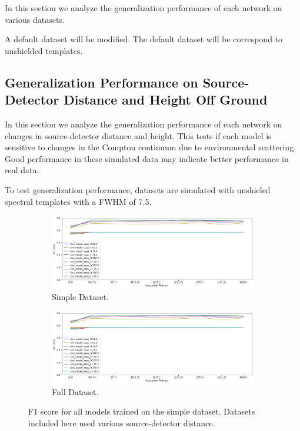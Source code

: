 In this section we analyze the generalization performance of each network on various datasets. 

A default dataset will be modified. The default dataset will be  correspond to unshielded templates. 

\subsection{Generalization Performance on Source-Detector Distance and Height Off Ground}

In this section we analyze the generalization performance of each network on changes in source-detector distance and height. This tests if each model is sensitive to changes in the Compton continuum due to environmental scattering. Good performance in these simulated data may indicate better performance in real data.

To test generalization performance, datasets are simulated with unshieled spectral templates with a FWHM of 7.5. 


\begin{figure}[H]
     \centering
     \begin{subfigure}[b]{0.9\textwidth}
         \centering
         \includegraphics[width=\textwidth]{images/results_easy_distance_comparison}
         \caption{Simple Dataset.}
         \label{fig:results_easy_distance_comparison_simple}
     \end{subfigure}

     \begin{subfigure}[b]{0.9\textwidth}
         \centering
         \includegraphics[width=\textwidth]{images/results_easy_distance_comparison}
         \caption{Full Dataset.}
         \label{fig:results_easy_distance_comparison_full}
     \end{subfigure}
        \caption{F1 score for all models trained on the simple dataset. Datasets included here used various source-detector distance.}
        \label{fig:results_easy_distance_comparison}
\end{figure}

